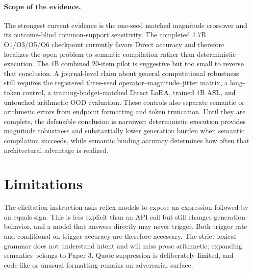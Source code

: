 \documentclass[11pt]{article}
\begin{document}
\paragraph{Scope of the evidence.}
The strongest current evidence is the one-seed matched magnitude crossover and
its outcome-blind common-support sensitivity. The completed 1.7B O1/O3/O5/O6
checkpoint currently favors Direct accuracy and therefore localizes the open
problem to semantic compilation rather than deterministic execution. The 4B
combined 20-item pilot is suggestive but too small to reverse that conclusion. A
journal-level claim about general computational robustness still requires the
registered three-seed operator--magnitude--jitter matrix, a long-token control,
a training-budget-matched Direct LoRA, trained 4B ASL, and untouched arithmetic
OOD evaluation. These controls
also separate semantic or arithmetic errors from endpoint formatting and token
truncation.  Until they are complete, the defensible conclusion is narrower:
deterministic execution provides magnitude robustness and substantially lower
generation burden when semantic compilation succeeds, while semantic binding
accuracy determines how often that architectural advantage is realized.

\section{Limitations}

The elicitation instruction asks reflex models to expose an expression followed
by an equals sign. This is less explicit than an API call but still changes
generation behavior, and a model that answers directly may never trigger. Both
trigger rate and conditional-on-trigger accuracy are therefore necessary. The
strict lexical grammar does not understand intent and will miss prose arithmetic;
expanding semantics belongs to Paper 3. Quote suppression is deliberately
limited, and code-like or unusual formatting remains an adversarial surface.
\end{document}
